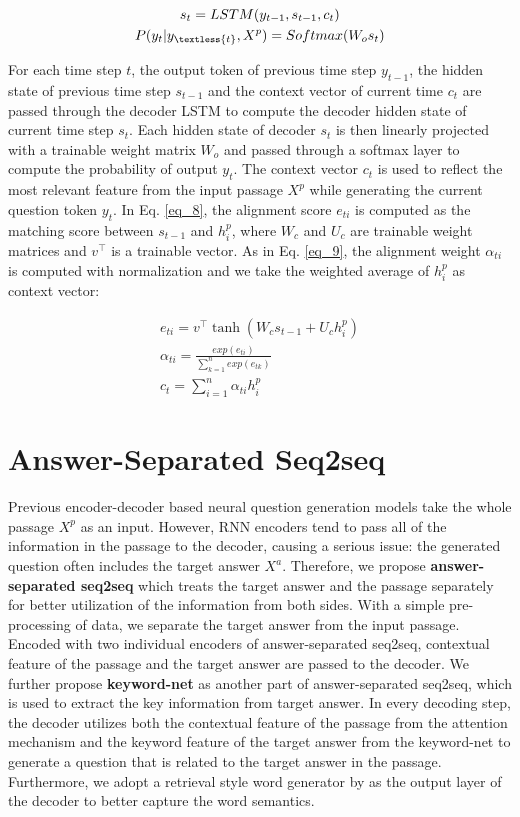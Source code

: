 \documentclass[letterpaper]{article} %
\begin{document}
\begin{gather}
s_t = LSTM(y_{t-1}, s_{t-1}, c_t) \label{eq_6} \\
P(y_t |y_{\textless{t}}, X^p) = Softmax(W_os_t) \label{eq_7}
\end{gather}

For each time step \(t\), the output token of previous time step \(y_{t-1}\), the hidden state of previous time step \(s_{t-1}\) and the context vector of current time \(c_t\) are passed through the decoder LSTM to compute the decoder hidden state of current time step \(s_t\). Each hidden state of decoder \(s_{t}\) is then linearly projected with a trainable weight matrix \(W_o\) and passed through a softmax layer to compute the probability of output \(y_t\). The context vector \(c_t\) is used to reflect the most relevant feature from the input passage \(X^p\) while generating the current question token \(y_t\).  In Eq. \eqref{eq_8},  the alignment score \(e_{ti}\) is computed as the matching score between \(s_{t-1}\) and \(h^p_i\), where \(W_c\) and \(U_c\) are trainable weight matrices and \(v^{\top}\) is a trainable vector. As in Eq. \eqref{eq_9}, the alignment weight \(\alpha_{ti}\) is computed with normalization and we take the weighted average of \(h^p_i\) as context vector:

\begin{gather}
e_{ti} = v^{\top}\tanh(W_cs_{t-1} + U_ch^p_i) \label{eq_8} \\
\alpha_{ti} = \frac{exp(e_{ti})}{\sum^{n}_{k=1}exp(e_{tk})} \label{eq_9} \\
c_t = \sum^{n}_{i=1}\alpha_{ti}h^p_i \label{eq_10}
\end{gather}

\section{Answer-Separated Seq2seq}
Previous encoder-decoder based neural question generation models take the whole passage \(X^p\) as an input. However, RNN encoders tend to pass all of the information in the passage to the decoder, causing a serious issue: the generated question often includes the target answer \(X^a\). Therefore, we propose \textbf{answer-separated seq2seq} which treats the target answer and the passage separately for better utilization of the information from both sides. With a simple pre-processing of data, we separate the target answer from the input passage. Encoded with two individual encoders of answer-separated seq2seq, contextual feature of the passage and the target answer are passed to the decoder. We further propose \textbf{keyword-net} as another part of answer-separated seq2seq, which is used to extract the key information from target answer.  In every decoding step, the decoder utilizes both the contextual feature of the passage from the attention mechanism and the keyword feature of the target answer from the keyword-net to generate a question that is related to the target answer in the passage. Furthermore, we adopt a retrieval style word generator by \cite{ma2018query} as the output layer of the decoder to better capture the word semantics.
\end{document}

